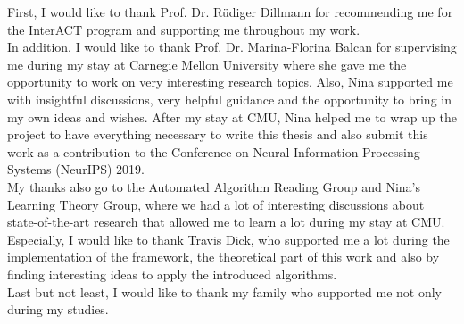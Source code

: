 \acks

First, I would like to thank Prof. Dr. Rüdiger Dillmann for recommending me for the InterACT program and supporting me throughout my work.\\

In addition, I would like to thank Prof. Dr. Marina-Florina Balcan for supervising me during my stay at Carnegie Mellon University where she gave me the opportunity to work on very interesting research topics. Also, Nina supported me with insightful discussions, very helpful guidance and the opportunity to bring in my own ideas and wishes. After my stay at CMU, Nina helped me to wrap up the project to have everything necessary to write this thesis and also submit this work as a contribution to the Conference on Neural Information Processing Systems (NeurIPS) 2019.\\

My thanks also go to the Automated Algorithm Reading Group and Nina's Learning Theory Group, where we had a lot of interesting discussions about state-of-the-art research that allowed me to learn a lot during my stay at CMU. Especially, I would like to thank Travis Dick, who supported me a lot during the implementation of the framework, the theoretical part of this work and also by finding interesting ideas to apply the introduced algorithms.\\

Last but not least, I would like to thank my family who supported me not only during my studies.